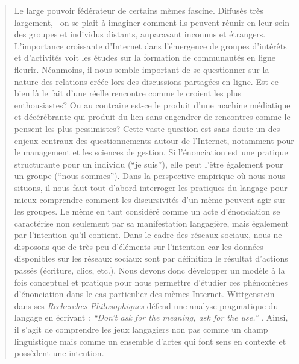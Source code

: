 \begin{quote}
Le large pouvoir f\'ed\'erateur de certains m\`emes fascine. Diffus\'es tr\`es largement, \ on se plait \`a imaginer comment ils peuvent r\'eunir en leur sein des groupes et individus distants, auparavant inconnus et \'etrangers. L{\textquoteright}importance croissante d{\textquoteright}Internet dans l{\textquoteright}\'emergence de groupes d{\textquoteright}int\'er\^ets et d{\textquoteright}activit\'es voit les \'etudes sur la formation de communaut\'es en ligne fleurir. N\'eanmoins, il nous semble important de se questionner sur la nature des relations cr\'e\'ee lors des discussions partag\'ees en ligne. Est-ce bien l\`a le fait d{\textquoteright}une r\'eelle rencontre comme le croient les plus enthousiastes? Ou au contraire est-ce le produit d{\textquoteright}une machine m\'ediatique et d\'ec\'er\'ebrante qui produit du lien sans engendrer de rencontres comme le pensent les plus pessimistes? Cette vaste question est sans doute un des enjeux centraux des questionnements autour de l{\textquoteright}Internet, notamment pour le management et les sciences de gestion. Si l{\textquoteright}\'enonciation est une pratique structurante pour un individu ({\textquotedblleft}je suis{\textquotedblright}), elle peut l{\textquoteright}\^etre \'egalement pour un groupe ({\textquotedblleft}nous sommes{\textquotedblright}). Dans la perspective empirique o\`u nous nous situons, il nous faut tout d{\textquoteright}abord interroger les pratiques du langage pour mieux comprendre comment les discursivit\'es d{\textquoteright}un m\`eme peuvent agir sur les groupes. Le m\`eme en tant consid\'er\'e comme un acte d{\textquoteright}\'enonciation se caract\'erise non seulement par sa manifestation langagi\`ere, mais \'egalement par l{\textquoteright}intention qu{\textquoteright}il contient. Dans le cadre des r\'eseaux sociaux, nous ne disposons que de tr\`es peu d{\textquoteright}\'el\'ements sur l{\textquoteright}intention car les donn\'ees disponibles sur les r\'eseaux sociaux sont par d\'efinition le r\'esultat d{\textquoteright}actions pass\'es (\'ecriture, clics, etc.).\textit{ }Nous devons donc d\'evelopper un mod\`ele \`a la fois conceptuel et pratique pour nous permettre d{\textquoteright}\'etudier ces ph\'enom\`enes d{\textquoteright}\'enonciation dans le cas particulier des m\`emes Internet. Wittgenstein dans ses \textit{Recherches Philosophiques }d\'efend une analyse pragmatique du langage en \'ecrivant : \textit{{\textquotedblleft}Don{\textquoteright}t ask for the meaning, ask for the use.{\textquotedblright}} \cite{Wittgenstein2004}. Ainsi, il s{\textquoteright}agit de comprendre les jeux langagiers non pas comme un champ linguistique mais comme un ensemble d{\textquoteright}actes qui font sens en contexte et poss\`edent une intention. 

\end{quote}
